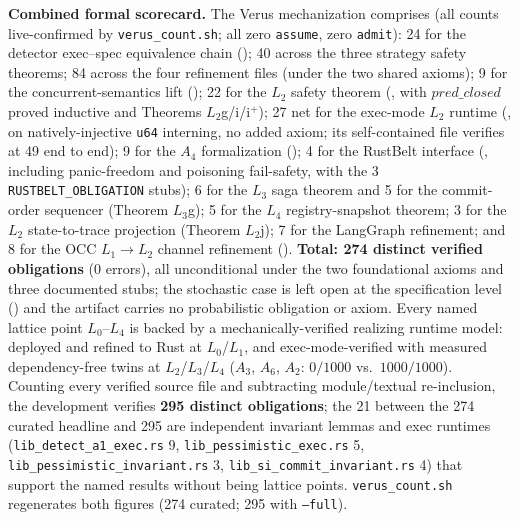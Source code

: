 \documentclass[journal,compsoc,10pt]{IEEEtran}
\theoremstyle{definition}
\theoremstyle{remark}
\begin{document}
\medskip
\noindent\textbf{Combined formal scorecard.}
The Verus mechanization comprises (all counts live-confirmed by
\texttt{verus\_count.sh}; all zero \texttt{assume}, zero \texttt{admit}):
24 for the detector exec--spec equivalence chain
(); 40 across the three strategy safety
theorems; 84 across the four refinement files (under the two shared
axioms); 9 for the concurrent-semantics lift
(); 22 for the $L_2$ safety theorem
(, with $\mathit{pred\_closed}$ proved inductive and
Theorems $L_2$g/i/i$^+$); 27 net for the exec-mode $L_2$ runtime
(, on natively-injective \texttt{u64} interning, no
added axiom; its self-contained file verifies at 49 end to end); 9 for the
$A_4$ formalization (); 4 for the RustBelt
interface (, including panic-freedom and
poisoning fail-safety, with the 3 \texttt{RUSTBELT\_OBLIGATION} stubs); 6
for the $L_3$ saga theorem and 5 for the commit-order sequencer (Theorem
$L_3$g); 5 for the $L_4$ registry-snapshot theorem; 3 for the $L_2$
state-to-trace projection (Theorem $L_2$j); 7 for the LangGraph refinement;
and 8 for the OCC $L_1\to L_2$ channel refinement
(). \textbf{Total: 274 distinct
verified obligations} (0 errors), all unconditional under the two
foundational axioms and three documented stubs; the stochastic case is
left open at the specification level () and the
artifact carries no probabilistic obligation or axiom. Every named lattice
point $L_0$--$L_4$ is backed by a mechanically-verified realizing runtime
model: deployed and refined to Rust at $L_0$/$L_1$, and exec-mode-verified
with measured dependency-free twins at $L_2$/$L_3$/$L_4$ ($A_3$, $A_6$,
$A_2$: $0/1000$ vs.\ $1000/1000$). Counting every verified source file and
subtracting module/textual re-inclusion, the development verifies
\textbf{295 distinct obligations}; the 21 between the 274 curated headline
and 295 are independent invariant lemmas and exec runtimes
(\texttt{lib\_detect\_a1\_exec.rs} 9, \texttt{lib\_pessimistic\_exec.rs} 5,
\texttt{lib\_pessimistic\_invariant.rs} 3, \texttt{lib\_si\_commit\_invariant.rs}
4) that support the named results without being lattice points.
\texttt{verus\_count.sh} regenerates both figures (274 curated; 295 with
\texttt{--full}).
\end{document}
